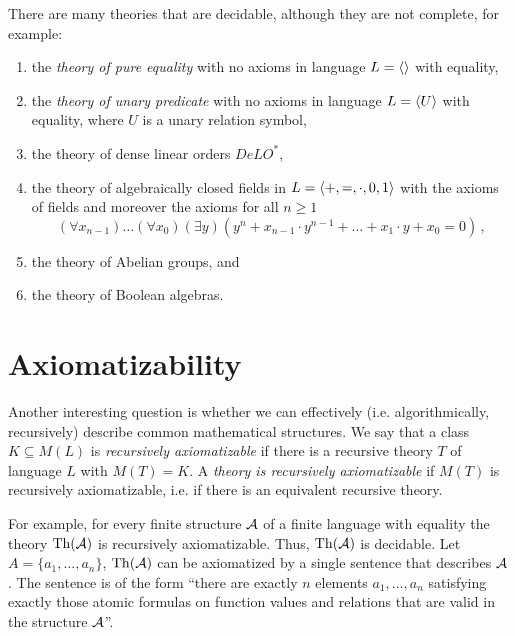 There are many theories that are decidable, although they are not complete, for example:
\begin{enumerate}
  \item the \emph{theory of pure equality} with no axioms in language $L = \langle  \rangle$ with equality,
  \item the \emph{theory of unary predicate} with no axioms in language $L = \langle U \rangle$ with equality, where $U$ is a unary relation symbol,
  \item the theory of dense linear orders $DeLO^*$,
  \item the theory of algebraically closed fields in $L = \langle +, =, \cdot, 0, 1 \rangle$ with the axioms of fields and moreover the axioms for all $n \geq 1$ $$(\forall x_{n-1})\dots(\forall x_0)(\exists y)(y^n + x_{n-1}\cdot y^{n-1} + \dots + x_1\cdot y + x_0 = 0)\,,$$
  \item the theory of Abelian groups, and
  \item the theory of Boolean algebras.
\end{enumerate}

\section{Axiomatizability}

Another interesting question is whether we can effectively (i.e. algorithmically, recursively) describe common mathematical structures. We say that a class $K \subseteq M(L)$ is \emph{recursively axiomatizable} if there is a recursive theory $T$ of language $L$ with $M(T)=K$. A \emph{theory is recursively axiomatizable} if $M(T)$ is recursively axiomatizable, i.e. if there is an equivalent recursive theory.

For example, for every finite structure $\mathcal{A}$ of a finite language with equality the theory $\operatorname{Th}(\mathcal{A})$ is recursively axiomatizable. Thus, $\operatorname{Th}(\mathcal{A})$ is decidable. Let $A = \{a_1, \dots, a_n\}$, $\operatorname{Th}(\mathcal{A})$ can be axiomatized by a single sentence that describes $\mathcal{A}$. The sentence is of the form ``there are exactly $n$ elements $a_1, \dots, a_n$ satisfying exactly those atomic formulas on function values and relations that are valid in the structure $\mathcal{A}$''.

